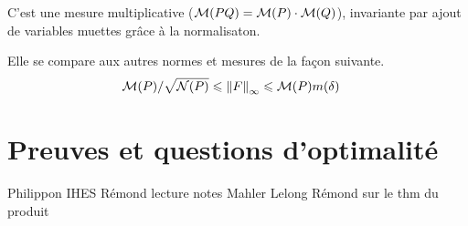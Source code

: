 C'est une mesure multiplicative ($\mathcal{M}(PQ) = \mathcal{M}(P) \cdot \mathcal{M}(Q)$),
invariante par ajout de variables muettes grâce à la normalisaton. 

Elle se compare aux autres normes et mesures de la façon suivante.
\begin{align}
  \mathcal{M}(P) / \sqrt{\mathcal N(P)}
  & \leqslant \left\lVert F\right\rVert_\infty
  \leqslant \mathcal{M}(P) m(\delta)
\end{align}

\section{Preuves et questions d'optimalité}

\begin{thebibliography}{9}
   Philippon IHES
   Rémond lecture notes
   Mahler
   Lelong
   Rémond sur le thm du produit
\end{thebibliography}


